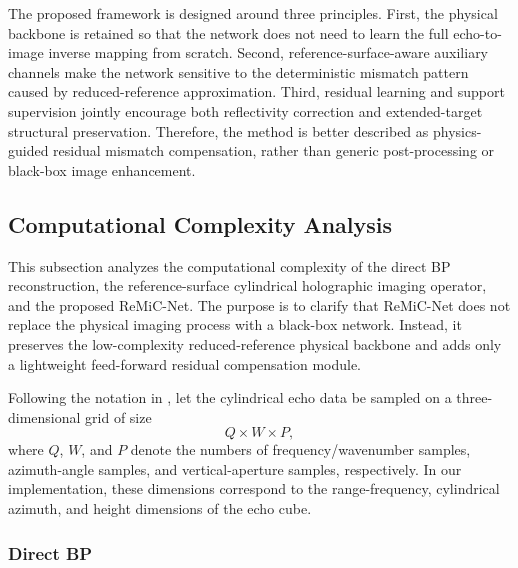 \documentclass[journal]{IEEEtran}
\begin{document}
The proposed framework is designed around three principles. First, the physical backbone is retained so that the network does not need to learn the full echo-to-image inverse mapping from scratch. Second, reference-surface-aware auxiliary channels make the network sensitive to the deterministic mismatch pattern caused by reduced-reference approximation. Third, residual learning and support supervision jointly encourage both reflectivity correction and extended-target structural preservation. Therefore, the method is better described as physics-guided residual mismatch compensation, rather than generic post-processing or black-box image enhancement.


\subsection{Computational Complexity Analysis}
\label{subsec:complexity_analysis}

This subsection analyzes the computational complexity of the direct BP reconstruction, the reference-surface cylindrical holographic imaging operator, and the proposed ReMiC-Net. The purpose is to clarify that ReMiC-Net does not replace the physical imaging process with a black-box network. Instead, it preserves the low-complexity reduced-reference physical backbone and adds only a lightweight feed-forward residual compensation module.

Following the notation in \cite{Tan2024CylindricalHolography}, let the cylindrical echo data be sampled on a three-dimensional grid of size
\begin{equation}
    Q \times W \times P,
\end{equation}
where $Q$, $W$, and $P$ denote the numbers of frequency/wavenumber samples, azimuth-angle samples, and vertical-aperture samples, respectively. In our implementation, these dimensions correspond to the range-frequency, cylindrical azimuth, and height dimensions of the echo cube.

\subsubsection{Direct BP}
\end{document}
